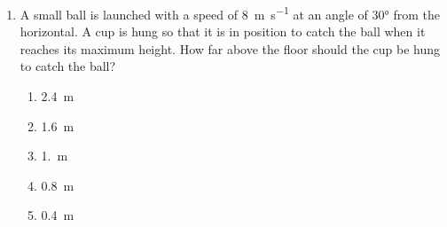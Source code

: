 \documentclass{../../../oss-apphys}
\begin{document}
\begin{multicols}{2}
\begin{enumerate}[resume,leftmargin=18pt]
    
    
  \item A small ball is launched with a speed of \SI{8}{\metre\per\second} at
    an angle of \ang{30} from the horizontal. A cup is hung so that it is in
    position to catch the ball when it reaches its maximum height. How far
    above the floor should the cup be hung to catch the ball?
    

    \begin{enumerate}[nosep,leftmargin=18pt,label=(\Alph*)]
    \item\SI{2.4}{\metre}
    \item\SI{1.6}{\metre}
    \item\SI{1.}{\metre}
    \item\SI{.8}{\metre}
    \item\SI{.4}{\metre}
    \end{enumerate}
  \end{enumerate}
  \newpage
  

\end{multicols}
\end{document}
